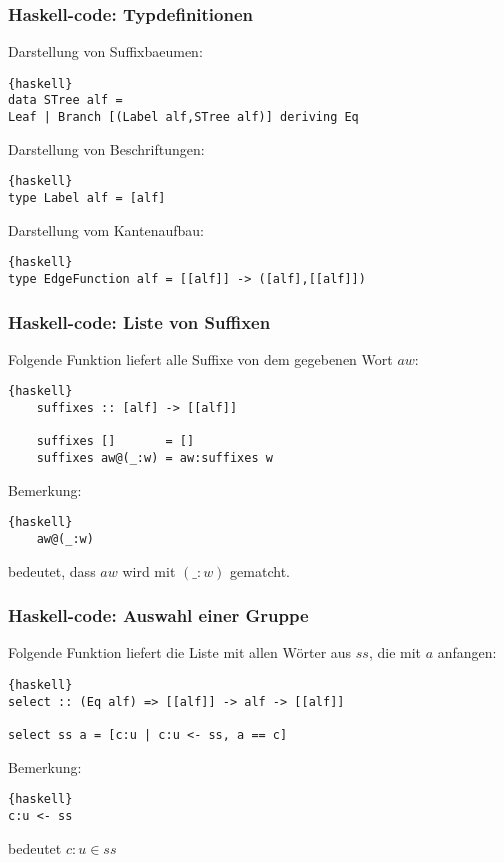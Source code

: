 \documentclass{beamer}
\begin{document}

\begin{frame}[fragile]
\frametitle{Haskell-code: Typdefinitionen}
Darstellung von Suffixbaeumen:
\begin{lstlisting}{haskell}
data STree alf = 
Leaf | Branch [(Label alf,STree alf)] deriving Eq
\end{lstlisting}
\bigskip
Darstellung von Beschriftungen:
\begin{lstlisting}{haskell}
type Label alf = [alf]
\end{lstlisting}
\bigskip
Darstellung vom Kantenaufbau:
\begin{lstlisting}{haskell}
type EdgeFunction alf = [[alf]] -> ([alf],[[alf]])
\end{lstlisting}
\end{frame}

\begin{frame}[fragile]
\frametitle{Haskell-code: Liste von Suffixen}
    Folgende Funktion liefert alle Suffixe von dem gegebenen Wort $aw$:
    \begin{lstlisting}{haskell}
    suffixes :: [alf] -> [[alf]]

    suffixes []       = []              
    suffixes aw@(_:w) = aw:suffixes w 
    \end{lstlisting}
    \bigskip
    Bemerkung: \begin{lstlisting}{haskell}
    aw@(_:w)
    \end{lstlisting} bedeutet, dass $aw$ wird mit $(\_:w)$ gematcht.
\end{frame}


\begin{frame}[fragile]
\frametitle{Haskell-code: Auswahl einer Gruppe}
    Folgende Funktion liefert die Liste mit allen Wörter aus $ss$, die mit $a$ anfangen:
\begin{lstlisting}{haskell}
select :: (Eq alf) => [[alf]] -> alf -> [[alf]]

select ss a = [c:u | c:u <- ss, a == c]
\end{lstlisting}
\bigskip
Bemerkung: \begin{lstlisting}{haskell}
c:u <- ss
\end{lstlisting} bedeutet $c:u \in ss$
\end{frame}
\end{document}
